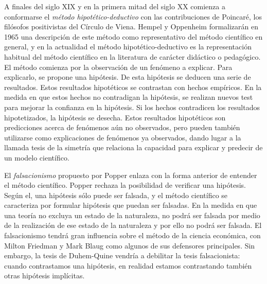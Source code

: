 \documentclass{nuevotema}
\begin{document}
A finales del siglo XIX y en la primera mitad del siglo XX comienza a conformarse el \textit{método hipotético-deductivo} con las contribuciones de Poincaré, los filósofos positivistas del Círculo de Viena. Hempel y Oppenheim formalizarán en 1965 una descripción de este método como representativo del método científico en general, y en la actualidad el método hipotético-deductivo es la representación habitual del método científico en la literatura de carácter didáctico o pedagógico. El método comienza por la observación de un fenómeno a explicar. Para explicarlo, se propone una hipótesis. De esta hipótesis se deducen una serie de resultados. Estos resultados hipotéticos se contrastan con hechos empíricos. En la medida en que estos hechos no contradigan la hipótesis, se realizan nuevos test para mejorar la confianza en la hipótesis. Si los hechos contradicen los resultados hipotetizados, la hipótesis se desecha. Estos resultados hipotéticos son predicciones acerca de fenómenos aún no observados, pero pueden también utilizarse como explicaciones de fenómenos ya observados, dando lugar a la llamada tesis de la simetría que relaciona la capacidad para explicar y predecir de un modelo científico. 

El \textit{falsacionismo} propuesto por Popper enlaza con la forma anterior de entender el método científico. Popper rechaza la posibilidad de verificar una hipótesis. Según el, una hipótesis sólo puede ser falsada, y el método científico se caracteriza por formular hipótesis que puedan ser falsadas. En la medida en que una teoría no excluya un estado de la naturaleza, no podrá ser falsada por medio de la realización de ese estado de la naturaleza y por ello no podrá ser falsada. El falsacionismo tendrá gran influencia sobre el método de la ciencia económica, con Milton Friedman y Mark Blaug como algunos de sus defensores principales. Sin embargo, la tesis de Duhem-Quine vendría a debilitar la tesis falsacionista: cuando contrastamos una hipótesis, en realidad estamos contrastando también otras hipótesis implícitas. 
\end{document}

